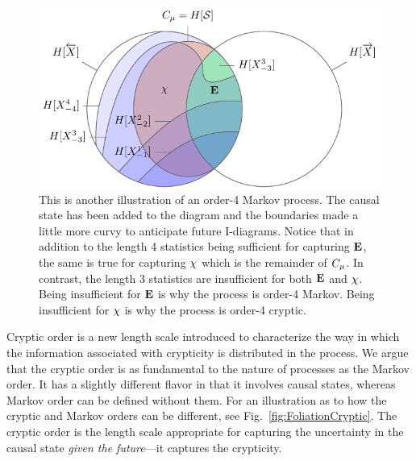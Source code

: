\begin{figure}[h!]
\centering
\includegraphics[scale = 1.2]{../chapter1/figures/tikz/FoliationCrypticReqk}
\caption{This is another illustration of an order-4 Markov process. The causal state has been added to the diagram and the boundaries made a little more curvy to anticipate future I-diagrams. Notice that in addition to the length 4 statistics being sufficient for capturing ${\bf E}$, the same is true for capturing $\chi$ which is the remainder of $C_\mu$. In contrast, the length 3 statistics are insufficient for both ${\bf E}$ and $\chi$. Being insufficient for ${\bf E}$ is why the process is order-4 Markov. Being insufficient for $\chi$ is why the process is order-4 cryptic.}
\label{fig:FoliationCrypticReqk}
\end{figure}

Cryptic order is a new length scale introduced to characterize the way in which the information associated with crypticity is distributed in the process. We argue that the cryptic order is as fundamental to the nature of processes as the Markov order. It has a slightly different flavor in that it involves causal states, whereas Markov order can be defined without them. For an illustration as to how the cryptic and Markov orders can be different, see Fig.~\ref{fig:FoliationCryptic}. The cryptic order is the length scale appropriate for capturing the uncertainty in the causal state \emph{given the future}---it captures the crypticity.

